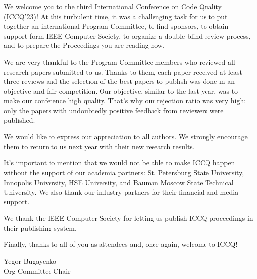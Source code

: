 \cleardoublepage
{}

We welcome you to the third International Conference on Code Quality (ICCQ'23)!
At this turbulent time,
it was a challenging task for us
to put together an international Program Committee,
to find sponsors,
to obtain support form IEEE Computer Society,
to organize a double-blind review process,
and to prepare the Proceedings you are reading now.

We are very thankful to the Program Committee members who
reviewed all research papers submitted to us. Thanks to them,
each paper received at least three reviews and the selection of the best papers to publish
was done in an objective and fair competition. Our objective,
similar to the last year, was to make our conference high quality.
That's why our rejection ratio was very high: only the
papers with undoubtedly positive feedback from reviewers were published.

We would like to express our appreciation to all authors.
We strongly encourage them to return to us next year
with their new research results.

It's important to mention that we would not be able to make
ICCQ happen without the support of our academia partners:
St. Petersburg State University,
Innopolis University,
HSE University,
and
Bauman Moscow State Technical University.
We also thank our industry partners for their financial and media support.

We thank the IEEE Computer Society for letting us publish ICCQ proceedings
in their publishing system.

Finally, thanks to all of you as attendees and, once again, welcome to ICCQ!

\vspace{18pt}
Yegor Bugayenko\\
Org Committee Chair
